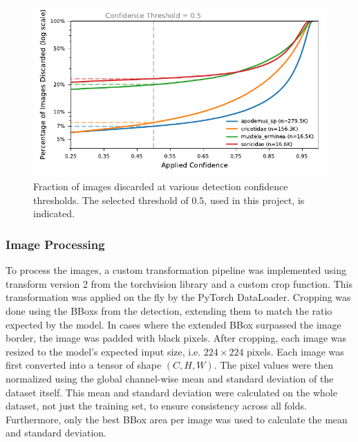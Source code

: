         \begin{figure}[ht]
        \centering
        \includegraphics{figures/discarded_img_by_conf.pdf}
        \caption{
            Fraction of images discarded at various detection confidence thresholds.
            The selected threshold of \(0.5\), used in this project, is indicated.
            }
        \label{fig:lost_images}
        \end{figure}        

        \subsubsection{Image Processing}
        To process the images, a custom transformation pipeline was implemented using transform version 2 from the torchvision library and a custom crop function.
        This transformation was applied on the fly by the PyTorch DataLoader.
        Cropping was done using the \acp{BBox} from the detection, extending them to match the ratio expected by the model.
        In cases where the extended \ac{BBox} surpassed the image border, the image was padded with black pixels.
        After cropping, each image was resized to the model's expected input size, i.e. \(224\times224\) pixels.
        Each image was first converted into a tensor of shape \((C,H,W)\).
        The pixel values were then normalized using the global channel-wise mean and standard deviation of the dataset itself.
        This mean and standard deviation were calculated on the whole dataset, not just the training set, to ensure consistency across all folds.
        Furthermore, only the best \ac{BBox} area per image was used to calculate the mean and standard deviation.


